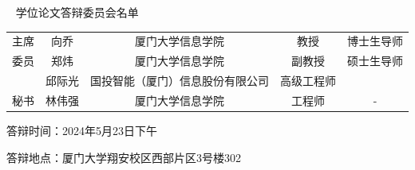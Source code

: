 

\begin{namelist}
\begin{center}
	~
	\vskip 0.1cm
	{\heiti {} 学位论文答辩委员会名单}
	\vskip 1cm
	\begin{tabularx}{\textwidth}{@{\extracolsep{\fill}}ccccc} 
		主席 & 向乔 & 厦门大学信息学院 & 教授 & 博士生导师\\ 
		委员 & 郑炜 & 厦门大学信息学院 & 副教授 & 硕士生导师\\ 
			& 邱际光 & 国投智能（厦门）信息股份有限公司 & 高级工程师\\ 
		秘书 & 林伟强 & 厦门大学信息学院 & 工程师 & -\\ 
	\end{tabularx}
\end{center}
\vspace{1cm}

\noindent 答辩时间：2024年5月23日下午

\noindent 答辩地点：厦门大学翔安校区西部片区3号楼302


\end{namelist}
